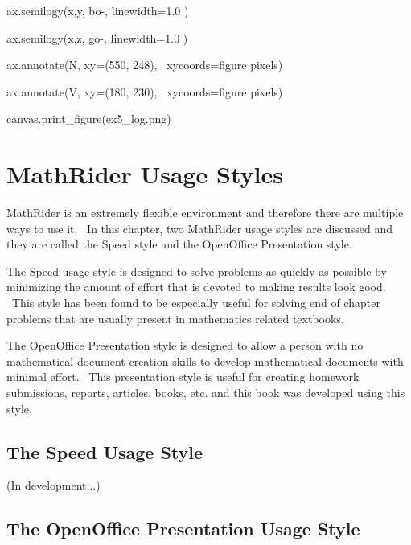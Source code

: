 \documentclass[12pt,twoside]{book}
\begin{document}
ax.semilogy(x,y, {\textquotesingle}bo{}-{\textquotesingle},
linewidth=1.0 )

ax.semilogy(x,z, {\textquotesingle}go{}-{\textquotesingle},
linewidth=1.0 )

ax.annotate({\textquotesingle}N{\textquotesingle}, xy=(550, 248),
\ xycoords={\textquotesingle}figure pixels{\textquotesingle})

ax.annotate({\textquotesingle}V{\textquotesingle}, xy=(180, 230),
\ xycoords={\textquotesingle}figure pixels{\textquotesingle})

canvas.print\_figure({\textquotesingle}ex5\_log.png{\textquotesingle})

{\textbar}


\bigskip

\chapter[MathRider Usage Styles]{MathRider Usage Styles}

MathRider is an extremely flexible environment and therefore there are multiple ways to use it. \ In this chapter, two MathRider usage styles are discussed and they are called the Speed style and the OpenOffice Presentation style. 

\bigskip

The Speed usage style is designed to solve problems as quickly as possible by minimizing the amount of effort that is devoted to making results look good. \ This style has been found to be especially useful for solving end of chapter problems that are usually present in mathematics related textbooks. 

\bigskip

The OpenOffice Presentation style is designed to allow a person with no mathematical document creation skills to develop mathematical documents with minimal effort. \ This presentation style is useful for creating homework submissions, reports, articles, books, etc. and this book was developed using this style.

\section[The Speed Usage Style]{The Speed Usage Style} (In development...)

\section[The OpenOffice Presentation Usage Style]{The OpenOffice Presentation Usage Style}
\end{document}
